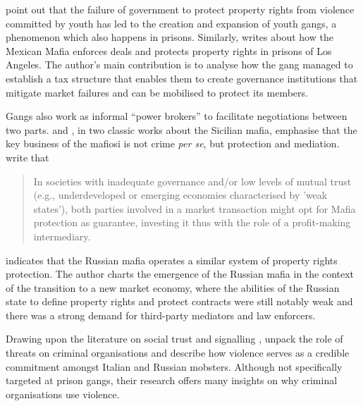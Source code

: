 \citet[]{sobel2009youth} point out that the failure of government to protect property rights from violence committed by youth has led to the creation and expansion of youth gangs, a phenomenon which also happens in prisons. Similarly, \citet{skarbek2011governance} writes about how the Mexican Mafia enforces deals and protects property rights in prisons of Los Angeles. The author's main contribution is to analyse how the gang managed to establish a tax structure that enables them to create governance institutions that mitigate market failures and can be mobilised to protect its members. 

Gangs also work as informal ``power brokers'' to facilitate negotiations between two parts. \citet[]{gambetta1996sicilian} and \citet[]{bandiera2003land}, in two classic works about the Sicilian mafia, emphasise that the key business of the mafiosi is not crime \textit{per se}, but protection and mediation. \citet[58]{gond2009reconsidering} write that

\begin{quotation}
In societies with inadequate governance and/or low levels of mutual trust (e.g., underdeveloped or emerging economies characterised by 'weak states'), both parties involved in a market transaction might opt for Mafia protection as guarantee, investing it thus with the role of a profit-making intermediary.
\end{quotation}

\citet[]{varese2001russian} indicates that the Russian mafia operates a similar system of property rights protection. The author charts the emergence of the Russian mafia in the context of the transition to a new market economy, where the abilities of the Russian state to define property rights and protect contracts were still notably weak and there was a strong demand for third-party mediators and law enforcers. 

Drawing upon the literature on social trust and signalling \citep{cook2007cooperation, schelling1980estrategy, schelling2007strategies}, \citet{campana2013cooperation} unpack the role of threats on criminal organisations and describe how violence serves as a credible commitment amongst Italian and Russian mobsters. Although not specifically targeted at prison gangs, their research offers many insights on why criminal organisations use violence. 

